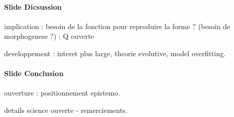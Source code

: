 \documentclass[11pt]{article}
\begin{document}
\paragraph{Slide Dicsussion}

implication : besoin de la fonction pour reproduire la forme ? (besoin de morphogenese ?) : Q ouverte

developpement : interet plus large, theorie evolutive, model overfitting.

\paragraph{Slide Conclusion}

ouverture : positionnement epistemo.

details science ouverte - remerciements.
\end{document}
